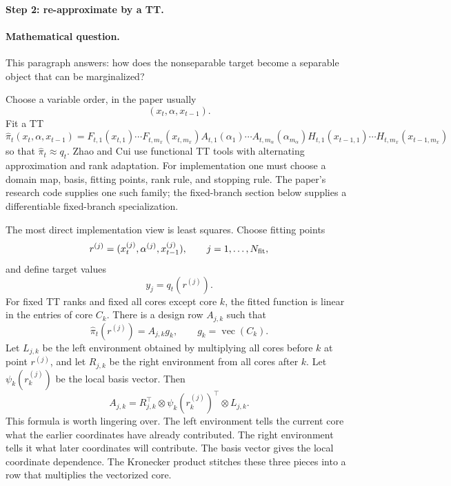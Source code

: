 \documentclass[11pt]{article}
\numberwithin{equation}{section}
\newcommand{\vecop}{\operatorname{vec}}
\begin{document}
\paragraph{Step 2: re-approximate by a TT.}
\paragraph{Mathematical question.}
This paragraph answers: how does the nonseparable target become a separable
object that can be marginalized?

Choose a variable order, in the paper usually
\[
    (x_t,\alpha,x_{t-1}).
\]
Fit a TT
\begin{equation}
    \widehat\pi_t(x_t,\alpha,x_{t-1})
    =
    F_{t,1}(x_{t,1})\cdots F_{t,m_x}(x_{t,m_x})
    A_{t,1}(\alpha_1)\cdots A_{t,m_\alpha}(\alpha_{m_\alpha})
    H_{t,1}(x_{t-1,1})\cdots H_{t,m_x}(x_{t-1,m_x})
    \label{eq:p24-a1-2}
\end{equation}
so that \(\widehat\pi_t\approx q_t\).  Zhao and Cui \cite{zhao2024ttsequential} use functional TT tools with
alternating approximation and rank adaptation.  For implementation one must
choose a domain map, basis, fitting points, rank rule, and stopping rule.  The
paper's research code supplies one such family; the fixed-branch section below
supplies a differentiable fixed-branch specialization.

The most direct implementation view is least squares.  Choose fitting points
\[
    r^{(j)}=(x_t^{(j)},\alpha^{(j)},x_{t-1}^{(j)}),
    \qquad j=1,\ldots,N_{\rm fit},
\]
and define target values
\[
    y_j=q_t(r^{(j)}).
\]
For fixed TT ranks and fixed all cores except core \(k\), the fitted function is
linear in the entries of core \(C_k\).  There is a design row \(A_{j,k}\) such
that
\begin{equation}
    \widehat\pi_t(r^{(j)})=A_{j,k}g_k,
    \qquad g_k=\vecop(C_k).
    \label{eq:p24-a1-2a}
\end{equation}
Let \(L_{j,k}\) be the left environment obtained by multiplying all cores before
\(k\) at point \(r^{(j)}\), and let \(R_{j,k}\) be the right environment from
all cores after \(k\).  Let
\(\psi_k(r_k^{(j)})\) be the local basis vector.  Then
\begin{equation}
    A_{j,k}
    =
    R_{j,k}^{\top}\otimes \psi_k(r_k^{(j)})^\top\otimes L_{j,k}.
    \label{eq:p24-a1-2b}
\end{equation}
This formula is worth lingering over.  The left environment tells the current
core what the earlier coordinates have already contributed.  The right
environment tells it what later coordinates will contribute.  The basis vector
gives the local coordinate dependence.  The Kronecker product stitches these
three pieces into a row that multiplies the vectorized core.
\end{document}
